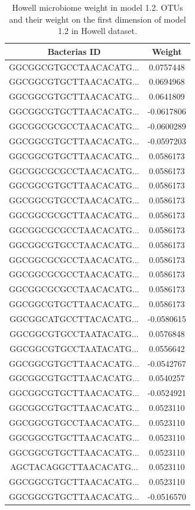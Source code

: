 \documentclass[
  12pt,
  a4paper,
  twoside,
  openright]{book}
\begin{document}
\begin{longtable}[t]{cc}
\caption[Howell microbiome weight in model 1.2]{\label{tab:howell-microbiome-1-2}Howell microbiome weight in model 1.2. OTUs and their weight on the first dimension of model 1.2 in Howell dataset.}\\
\toprule
Bacterias ID & Weight\\
\midrule
GGCGGCGTGCCTAACACATG... & 0.0757448\\
GGCGGCGTGCTTAACACATG... & 0.0694968\\
GGCGGCGTGCTTAACACATG... & 0.0641809\\
GGCGGCGTGCTTAACACATG... & -0.0617806\\
GGCGGCGCGCCTAACACATG... & -0.0600289\\
\addlinespace
GGCGGCGTGCTTAACACATG... & -0.0597203\\
GGCGGCGTGCTTAACACATG... & 0.0586173\\
GGCGGCGCGCCTAACACATG... & 0.0586173\\
GGCGGCGTGCTTAACACATG... & 0.0586173\\
GGCGGCGTGCCTAACACATG... & 0.0586173\\
\addlinespace
GGCGGCGCGCTTAACACATG... & 0.0586173\\
GGCGGCGCGCCTAACACATG... & 0.0586173\\
GGCGGCGTGCCTAACACATG... & 0.0586173\\
GGCGGCGCGCCTAACACATG... & 0.0586173\\
GGCGGCGCGCCTAACACATG... & 0.0586173\\
\addlinespace
GGCGGCGCGCCTAACACATG... & 0.0586173\\
GGCGGCGTGCTTAACACATG... & 0.0586173\\
GGCGGCATGCCTTACACATG... & -0.0580615\\
GGCGGCGTGCCTAATACATG... & 0.0576848\\
GGCGGCGTGCCTAATACATG... & 0.0556642\\
\addlinespace
GGCGGCGTGCTTAACACATG... & -0.0542767\\
GGCGGCGTGCTTAACACATG... & 0.0540257\\
GGCGGCGTGCTTAACACATG... & -0.0524921\\
GGCGGCGTGCTTAACACATG... & 0.0523110\\
GGCGGCGTGCCTAACACATG... & 0.0523110\\
\addlinespace
GGCGGCGTGCTTAACACATG... & 0.0523110\\
GGCGGCGTGCTTAACACATG... & 0.0523110\\
AGCTACAGGCTTAACACATG... & 0.0523110\\
GGCGGCGTGCTTAACACATG... & 0.0523110\\
GGCGGCGTGCTTAACACATG... & -0.0516570\\
\bottomrule
\end{longtable}
\end{document}
